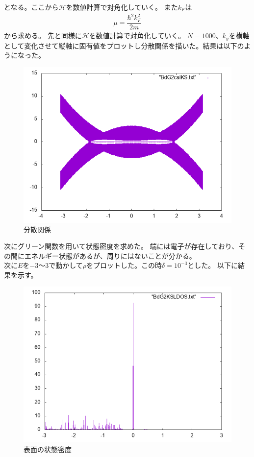 \documentclass{jarticle}
\begin{document}
となる。ここから$\mathcal{H}$を数値計算で対角化していく。
また$k_{F}$は
\begin{align}
\mu=\dfrac{\hbar^{2}k_F^{2}}{2m}
\end{align}
から求める。
先と同様に$\mathcal{H}$を数値計算で対角化していく。
$N=1000$、$k_y$を横軸として変化させて縦軸に固有値をプロットし分散関係を描いた。結果は以下のようになった。\\
\begin{figure}[H]
	\centering
	\includegraphics[scale=0.5]{BdG2calKS.png}
	\caption{分散関係}
\end{figure}
次にグリーン関数を用いて状態密度を求めた。
端には電子が存在しており、その間にエネルギー状態があるが、周りにはないことが分かる。\\
次に$E$を$-3$〜$3$で動かして$\rho$をプロットした。この時$\delta=10^{-3}$とした。
以下に結果を示す。
\begin{figure}[H]
	\centering
	\includegraphics[scale=0.5]{BdGKSLDOSedge.png}
	\caption{表面の状態密度}
\end{figure}
\end{document}
